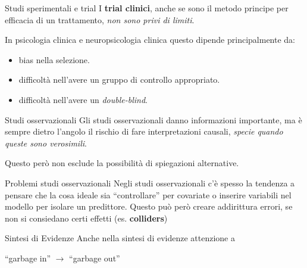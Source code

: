 \documentclass[
  ignorenonframetext,
]{beamer}
\providecommand{\tightlist}{%
  \setlength{\itemsep}{0pt}\setlength{\parskip}{0pt}}
\begin{document}
\begin{frame}{Studi sperimentali e trial}
\label{studi-sperimentali-e-trial}
I \textbf{trial clinici}, anche se sono il metodo principe per efficacia
di un trattamento, \emph{non sono privi di limiti}.

In psicologia clinica e neuropsicologia clinica questo dipende
principalmente da:

\begin{itemize}
\tightlist
\item
  bias nella selezione.
\item
  difficoltà nell'avere un gruppo di controllo appropriato.
\item
  difficoltà nell'avere un \emph{double-blind}.
\end{itemize}
\end{frame}

\begin{frame}{Studi osservazionali}
\label{studi-osservazionali}
Gli studi osservazionali danno informazioni importante, ma è sempre
dietro l'angolo il rischio di fare interpretazioni causali, \emph{specie
quando queste sono verosimili}.

Questo però non esclude la possibilità di spiegazioni alternative.
\end{frame}

\begin{frame}{Problemi studi osservazionali}
\label{problemi-studi-osservazionali}
Negli studi osservazionali c'è spesso la tendenza a pensare che la cosa
ideale sia ``controllare'' per covariate o inserire variabili nel
modello per isolare un predittore. Questo può però creare addirittura
errori, se non si consiedano certi effetti (es. \textbf{colliders})
\end{frame}

\begin{frame}{Sintesi di Evidenze}
\label{sintesi-di-evidenze}
Anche nella sintesi di evidenze attenzione a

``garbage in'' \(\to\) ``garbage out''
\end{frame}
\end{document}

